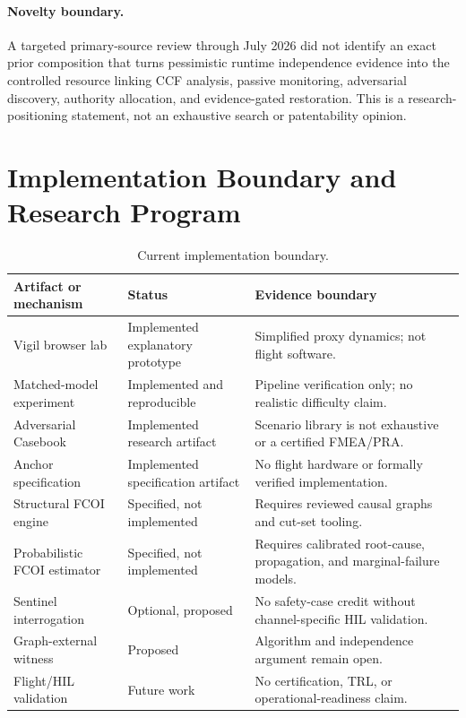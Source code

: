 \paragraph{Novelty boundary.} A targeted primary-source review through July 2026 did not identify an exact prior composition that turns pessimistic runtime independence evidence into the controlled resource linking CCF analysis, passive monitoring, adversarial discovery, authority allocation, and evidence-gated restoration. This is a research-positioning statement, not an exhaustive search or patentability opinion.

\section{Implementation Boundary and Research Program}
\begin{table}[t]
\centering
\caption{Current implementation boundary.}
\label{tab:status}
\small
\begin{tabularx}{\textwidth}{@{}p{}p{}X@{}}
\toprule
Artifact or mechanism & Status & Evidence boundary \\
\midrule
Vigil browser lab & Implemented explanatory prototype & Simplified proxy dynamics; not flight software. \\
Matched-model experiment & Implemented and reproducible & Pipeline verification only; no realistic difficulty claim. \\
Adversarial Casebook & Implemented research artifact & Scenario library is not exhaustive or a certified FMEA/PRA. \\
Anchor specification & Implemented specification artifact & No flight hardware or formally verified implementation. \\
Structural FCOI engine & Specified, not implemented & Requires reviewed causal graphs and cut-set tooling. \\
Probabilistic FCOI estimator & Specified, not implemented & Requires calibrated root-cause, propagation, and marginal-failure models. \\
Sentinel interrogation & Optional, proposed & No safety-case credit without channel-specific HIL validation. \\
Graph-external witness & Proposed & Algorithm and independence argument remain open. \\
Flight/HIL validation & Future work & No certification, TRL, or operational-readiness claim. \\
\bottomrule
\end{tabularx}
\end{table}

